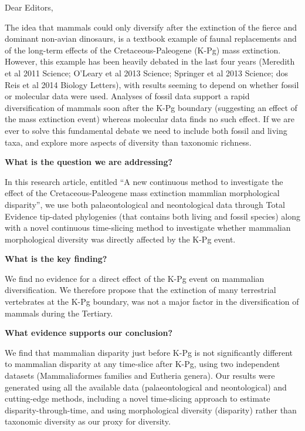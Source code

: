 \documentclass[11pt]{letter}
\begin{document}
\begin{letter}{}
\opening{Dear Editors,}

The idea that mammals could only diversify after the extinction of the fierce and dominant non-avian dinosaurs, is a textbook example of faunal replacements and of the long-term effects of the Cretaceous-Paleogene (K-Pg) mass extinction.
However, this example has been heavily debated in the last four years (Meredith et al 2011 Science; O'Leary et al 2013 Science; Springer et al 2013 Science; dos Reis et al 2014 Biology Letters), with results seeming to depend on whether fossil or molecular data were used.
Analyses of fossil data support a rapid diversification of mammals soon after the K-Pg boundary (suggesting an effect of the mass extinction event) whereas molecular data finds no such effect.
If we are ever to solve this fundamental debate we need to include both fossil and living taxa, and explore more aspects of diversity than taxonomic richness.

\textbf{What is the question we are addressing?}

In this research article, entitled ``A new continuous method to investigate the effect of the Cretaceous-Paleogene mass extinction mammlian morphological disparity'', we use both palaeontological and neontological data through Total Evidence tip-dated phylogenies (that contains both living and fossil species) along with a novel continuous time-slicing method to investigate whether mammalian morphological diversity was directly affected by the K-Pg event.

\textbf{What is the key finding?}

We find no evidence for a direct effect of the K-Pg event on mammalian diversification.
We therefore propose that the extinction of many terrestrial vertebrates at the K-Pg boundary, was not a major factor in the diversification of mammals during the Tertiary. 

\textbf{What evidence supports our conclusion?}

We find that mammalian disparity just before K-Pg is not significantly different to mammalian disparity at any time-slice after K-Pg, using two independent datasets (Mammaliaformes families and Eutheria genera).
Our results were generated using all the available data (palaeontological and neontological) and cutting-edge methods, including a novel time-slicing approach to estimate disparity-through-time, and using morphological diversity (disparity) rather than taxonomic diversity as our proxy for diversity.


\end{letter}
\end{document}
